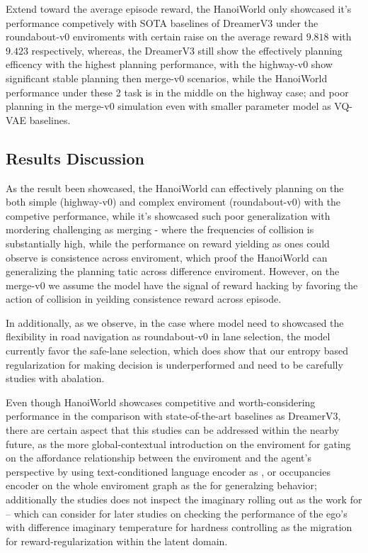 Extend toward the average episode reward, the HanoiWorld only showcased it's performance competively with SOTA baselines of DreamerV3 under the roundabout-v0 enviroments with certain raise on the average reward $9.818$ with $9.423$ respectively, whereas,  the DreamerV3 still show the effectively planning efficency with the highest planning performance, with the highway-v0 show significant stable planning then merge-v0 scenarios, while the HanoiWorld performance under these 2 task is in the middle on the highway case; and poor planning in the merge-v0 simulation even with smaller parameter model as VQ-VAE baselines. 


\subsection{Results Discussion}

As the result been showcased, the HanoiWorld can effectively planning on the both simple (highway-v0) and complex enviroment (roundabout-v0) with the competive performance, while it's showcased such poor generalization with mordering challenging as merging - where the frequencies of collision is substantially high, while the performance on reward yielding as ones could observe is consistence across enviroment, which proof the HanoiWorld can generalizing the planning tatic across difference enviroment. However, on the merge-v0 we assume the model have the signal of reward hacking by favoring the action of collision in yeilding consistence reward across episode.

In additionally, as we observe, in the case where model need to showcased the flexibility in road navigation as roundabout-v0 in lane selection, the model currently favor the safe-lane selection, which does show that our entropy based regularization for making decision is underperformed and need to be carefully studies with abalation.

Even though HanoiWorld showcases competitive and worth-considering performance in the comparison with state-of-the-art baselines as DreamerV3, there are certain aspect that this studies can be addressed within the nearby future, as the more global-contextual introduction on the enviroment for gating on the affordance relationship between the enviroment and the agent's perspective by using text-conditioned language encoder as \cite{hu_2023_gaia1}, or occupancies encoder on the whole enviroment graph as the \cite{Zhao2024, vasudevan_2024_planning} for generalzing behavior; additionally the studies does not inspect the imaginary rolling out as the work for \cite{ha_2018_world} -- which can consider for later studies on checking the performance of the ego's with difference imaginary temperature for hardness controlling as the migration for reward-regularization within the latent domain.